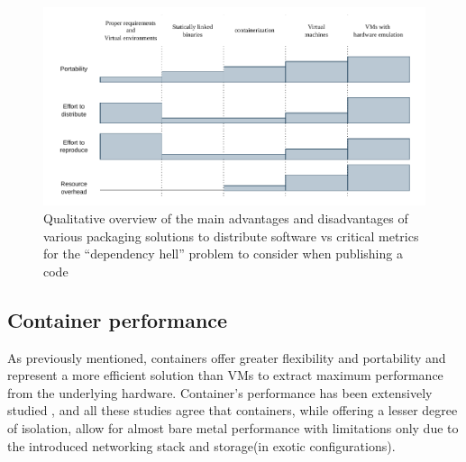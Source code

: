 \begin{figure}[h]
    \centering
    \includegraphics[width=\textwidth]{img/chpt1/solutions-spectrum}
    \caption{Qualitative overview of the main advantages and disadvantages of
      various packaging solutions to distribute software vs critical metrics for
      the ``dependency hell'' problem to consider when publishing a code}
    \label{fig:solspectrum}
\end{figure}


\subsection{Container performance}


As previously mentioned, containers offer greater flexibility and portability
and represent a more efficient solution than VMs to extract maximum performance
from the underlying hardware. Container's performance has been extensively
studied \cite{Li2023,Sharma2016,Felter_2015,deochake2023}, and all these
studies agree that containers, while offering a lesser degree of isolation,
allow for almost bare metal performance with limitations only due to the
introduced networking stack and storage(in exotic configurations).

